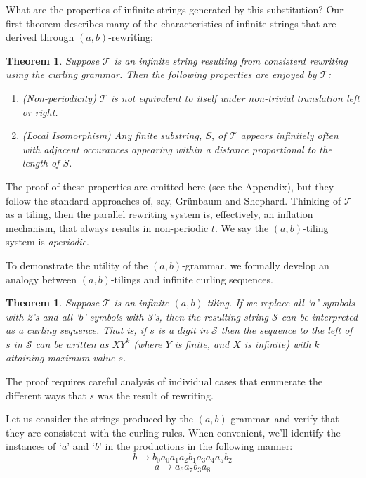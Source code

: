 \documentclass[11pt]{article}
\def\emph#1{{\em #1\/}}
\def\term#1{\emph{#1}}
\newcounter{thm}
\newtheorem{theorem}[thm]{Theorem}
\def\ni{\noindent}
\def\ab{$(a,b)$}
\def\abg{\ab-grammar}
\def\q#1{`$#1$'}
\begin{document}
What are the properties of infinite strings generated by this substitution?  Our first theorem describes many of the characteristics of infinite strings that are derived through \ab-rewriting:
\def\scS{\mathcal{S}}
\def\scT{\mathcal{T}}
\begin{theorem}\label{thm:aperiodic}
Suppose $\scT$ is an infinite string resulting from 
consistent rewriting using the curling grammar.  Then the following properties are enjoyed by $\scT$:
\begin{enumerate}
\item (Non-periodicity) $\scT$ is not equivalent to itself under
non-trivial translation left or right.
\item (Local Isomorphism) Any finite substring, $S$, of $\scT$ appears
infinitely often with adjacent occurances appearing within a distance proportional to the length of $S$.
\end{enumerate}
\end{theorem}
\ni The proof of these properties are omitted here (see the Appendix), but they
follow the standard approaches of, say, Gr\"unbaum and Shephard\cite{Gr87}.
Thinking of $\scT$ as a tiling, then the parallel rewriting system is,
effectively, an inflation mechanism, that always results in non-periodic $t$.  We say the \ab-tiling system is \term{aperiodic}.

To demonstrate the utility of the \abg, we formally develop an analogy
between \ab-tilings and infinite curling sequences.

\begin{theorem}
Suppose $\scT$ is an infinite \ab-tiling.  If we replace all \q{a} symbols with
2's and all \q{b} symbols with 3's, then the resulting string $\scS$ can be
interpreted as a curling sequence.  That is, if $s$ is a digit
in $\scS$ then the sequence to the left of $s$ in $\scS$ can be written as
$XY^k$ (where $Y$ is finite, and $X$ is infinite) with $k$ attaining maximum
value $s$.
\end{theorem}
\ni The proof requires careful analysis of individual cases that
enumerate the different ways that $s$ was the result of rewriting. 

Let us consider the strings produced by the \abg\ and verify that they
are consistent with the curling rules.  When convenient, we'll identify the instances
of \q{a} and \q{b} in the productions in the following manner:
$$b\rightarrow b_0a_0a_1a_2b_1a_3a_4a_5b_2$$
$$a\rightarrow a_6a_7b_3a_8$$
\end{document}

